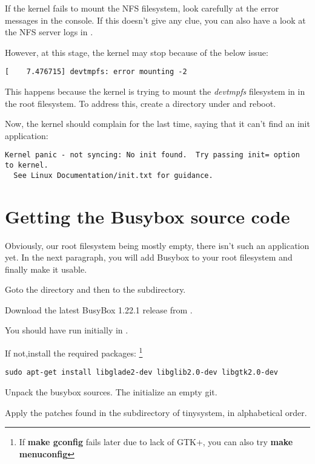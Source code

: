 If the kernel fails to mount the NFS filesystem, look carefully at the
error messages in the console. If this doesn't give any clue, you can
also have a look at the NFS server logs in .

However, at this stage, the kernel may stop because of the below
issue:

\begin{verbatim}
[    7.476715] devtmpfs: error mounting -2
\end{verbatim}

This happens because the kernel is trying to mount the {\em devtmpfs}
filesystem in  in the root filesystem. To address this,
create a  directory under  and reboot.

Now, the kernel should complain for the last time, saying that it can't
find an init application:

\footnotesize
\begin{verbatim}
Kernel panic - not syncing: No init found.  Try passing init= option to kernel.
  See Linux Documentation/init.txt for guidance.
\end{verbatim}
\normalsize
\clearpage

\section{Getting the Busybox source code}

Obviously, our root filesystem being mostly empty, there isn't such an
application yet. In the next paragraph, you will add Busybox to your root
filesystem and finally make it usable.

Goto the \labdir directory and then to the  subdirectory.

Download the latest BusyBox 1.22.1 release from .

You should have run  initially in \labdir.

If not,install the required packages:
\footnote{If {\bf make gconfig} fails later due to lack of GTK+, you can also try {\bf make menuconfig}}

\begin{verbatim}
sudo apt-get install libglade2-dev libglib2.0-dev libgtk2.0-dev
\end{verbatim}

Unpack the busybox sources. The initialize an empty git.

Apply the patches found in the  subdirectory of {tinysystem}, in alphabetical order.


